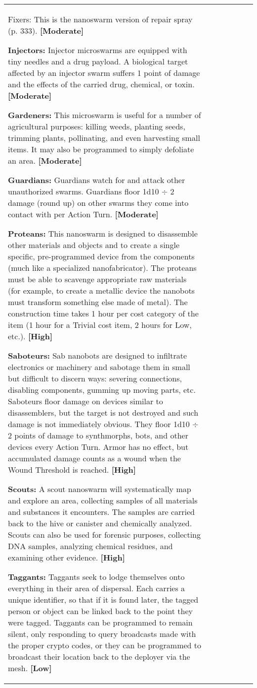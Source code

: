 \begin{tabular}{|l|l|l|l|l|l|l|}
Fixers: This is the nanoswarm version of repair spray (p. 333). \textbf{[Moderate]} 

\textbf{Injectors:} Injector microswarms are equipped with tiny needles and a drug payload. A biological target affected by an injector swarm suffers 1 point of damage and the effects of the carried drug, chemical, or toxin. \textbf{[Moderate]} 

\textbf{Gardeners:} This microswarm is useful for a number of agricultural purposes: killing weeds, planting seeds, trimming plants, pollinating, and even harvesting small items. It may also be programmed to simply defoliate an area. \textbf{[Moderate]} 

\textbf{Guardians:} Guardians watch for and attack other unauthorized swarms. Guardians floor 1d10 $\div$ 2 damage (round up) on other swarms they come into contact with per Action Turn. \textbf{[Moderate]} 

\textbf{Proteans:} This nanoswarm is designed to disassemble other materials and objects and to create a single specific, pre-programmed device from the components (much like a specialized nanofabricator). The proteans must be able to scavenge appropriate raw materials (for example, to create a metallic device the nanobots must transform something else made of metal). The construction time takes 1 hour per cost category of the item (1 hour for a Trivial cost item, 2 hours for Low, etc.). \textbf{[High]} 

\textbf{Saboteurs:} Sab nanobots are designed to infiltrate electronics or machinery and sabotage them in small but difficult to discern ways: severing connections, disabling components, gumming up moving parts, etc. Saboteurs floor damage on devices similar to disassemblers, but the target is not destroyed and such damage is not immediately obvious. They floor 1d10 $\div$ 2 points of damage to synthmorphs, bots, and other devices every Action Turn. Armor has no effect, but accumulated damage counts as a wound when the Wound Threshold is reached. \textbf{[High]} 

\textbf{Scouts:} A scout nanoswarm will systematically map and explore an area, collecting samples of all materials and substances it encounters. The samples are carried back to the hive or canister and chemically analyzed. Scouts can also be used for forensic purposes, collecting DNA samples, analyzing chemical residues, and examining other evidence. \textbf{[High]} 

\textbf{Taggants:} Taggants seek to lodge themselves onto everything in their area of dispersal. Each carries a unique identifier, so that if it is found later, the tagged person or object can be linked back to the point they were tagged. Taggants can be programmed to remain silent, only responding to query broadcasts made with the proper crypto codes, or they can be programmed to broadcast their location back to the deployer via the mesh. \textbf{[Low]} 




\end{tabular}
